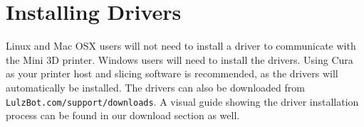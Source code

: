 \section{Installing Drivers}
Linux and Mac OSX users will not need to install a driver to communicate with the Mini 3D printer. Windows users will need to install the drivers. Using Cura as your printer host and slicing software is recommended, as the drivers will automatically be installed. The drivers can also be downloaded from \texttt{LulzBot.com/support/downloads}. A visual guide showing the driver installation process can be found in our download section as well.


%   




